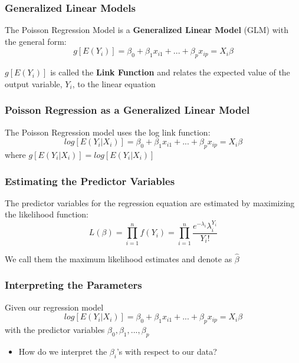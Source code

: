 \documentclass{beamer}
\begin{document}
\begin{frame}[fragile]\frametitle{Generalized Linear Models}

	The Poisson Regression Model is a \textbf{Generalized Linear Model} (GLM) with the general form:
	$$ g[E(Y_i)] = \beta_0 + \beta_1 x_{i1} + ... + \beta_p x_{ip} = X_i \beta $$

	$g[E(Y_i)]$ is called the \textbf{Link Function} and relates the expected value of the output variable, $Y_i$, to the linear equation
	
\end{frame}



\begin{frame}[fragile]\frametitle{Poisson Regression as a Generalized Linear Model}

	The Poisson Regression model uses the log link function:
 	$$ log[E(Y_i|X_i)] = \beta_0 + \beta_1 x_{i1} + ... + \beta_p x_{ip} = X_i \beta $$  		
 	where $ g[E(Y_i|X_i)] = log[E(Y_i|X_i)] $
		
	
\end{frame}



\begin{frame}[fragile]\frametitle{Estimating the Predictor Variables}

	The predictor variables for the regression equation are estimated by maximizing the likelihood function:
		$$ L(\beta) = \prod_{i=1}^{n} f(Y_i) = \prod_{i=1}^{n} \frac{ e^{-\lambda_i} \lambda_i^{Y_i} }{Y_i!} $$
		
	We call them the maximum likelihood estimates and denote as $\hat{\beta}$
	
\end{frame}



\begin{frame}[fragile]\frametitle{Interpreting the Parameters}	
	
	Given our regression model
	$$ log[E(Y_i|X_i)] = \beta_0 + \beta_1 x_{i1} + ... + \beta_p x_{ip} = X_i \beta $$  
	with the predictor variables $\beta_0, \beta_1, ..., \beta_p$
	
	\begin{itemize}
	
		\item How do we interpret the $\beta_i$'s with respect to our data?	
	
	\end{itemize}
	
\end{frame}
\end{document}
